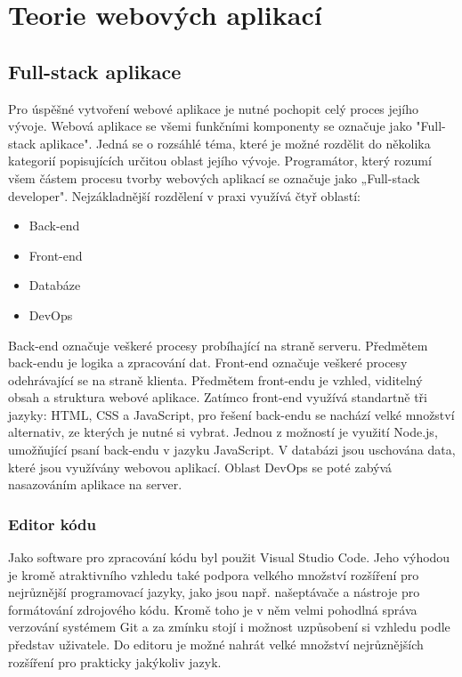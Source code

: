 \chapter{Teorie webových aplikací}
\section{Full-stack aplikace}
Pro úspěšné vytvoření webové aplikace je nutné pochopit celý proces jejího vývoje. Webová aplikace se všemi funkčními komponenty se označuje jako "Full-stack aplikace". Jedná se o rozsáhlé téma, které je možné rozdělit do několika kategorií popisujících určitou oblast jejího vývoje. Programátor, který rozumí všem částem procesu tvorby webových aplikací se označuje jako „Full-stack developer".  Nejzákladnější rozdělení v praxi využívá čtyř oblastí:

\begin{itemize}
\item Back-end
\item Front-end
\item Databáze
\item DevOps
\end{itemize}

Back-end označuje veškeré procesy probíhající na straně serveru. Předmětem back-endu je logika a zpracování dat. Front-end označuje veškeré procesy odehrávající se na straně klienta. Předmětem front-endu je vzhled, viditelný obsah a struktura webové aplikace. Zatímco front-end využívá standartně tři jazyky: HTML, CSS a JavaScript, pro řešení back-endu se nachází velké množství alternativ, ze kterých je nutné si vybrat. Jednou z možností je využití Node.js, umožňující psaní back-endu v jazyku JavaScript. V databázi jsou uschována data, které jsou využívány webovou aplikací. Oblast DevOps se poté zabývá nasazováním aplikace na server.

\subsection{Editor kódu}
Jako software pro zpracování kódu byl použit Visual Studio Code. Jeho výhodou je kromě atraktivního vzhledu také podpora velkého množství rozšíření pro nejrůznější programovací jazyky, jako jsou např. našeptávače a nástroje pro formátování zdrojového kódu. Kromě toho je v něm velmi pohodlná správa verzování systémem Git a za zmínku stojí i možnost uzpůsobení si vzhledu podle představ uživatele. Do editoru je možné nahrát velké množství nejrůznějších rozšíření pro prakticky jakýkoliv jazyk.

